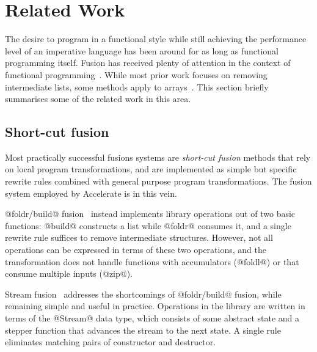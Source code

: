 \section{Related Work}
\label{sec:fusion_related_work}

The desire to program in a functional style while still achieving the
performance level of an imperative language has been around for as long as
functional programming itself. Fusion has received plenty of attention in the
context of functional
programming~\cite{Coutts:2007kp,Gill:1993de,Hu:1997tk,Meijer:1991,Rompf:2013er,Takano:1995,Wadler:1984ia,Waters:1991fp}.
While most prior work focuses on removing intermediate lists, some methods apply
to arrays~\cite{Chakravarty:2001dt,Claessen:2012hl,Grelck:2006ci,Keller:2010er}.
This section briefly summarises some of the related work in this area.


\subsection{Short-cut fusion}

Most practically successful fusions systems are \emph{short-cut fusion}
 methods that rely on local program transformations, and
are implemented as simple but specific rewrite rules combined with general
purpose program transformations. The fusion system employed by Accelerate is in
this vein.


@foldr/build@ fusion~\cite{Gill:1996tf,Gill:1993de}
instead implements library operations out of two basic functions: @build@
constructs a list while @foldr@ consumes it, and a single rewrite rule suffices
to remove intermediate structures. However, not all operations can be expressed
in terms of these two operations, and the transformation does not handle
functions with accumulators (@foldl@) or that consume multiple inputs (@zip@).

Stream fusion~\cite{Coutts:2007kp} addresses the
shortcomings of @foldr/build@ fusion, while remaining simple and useful in
practice. Operations in the library are written in terms of the @Stream@ data
type, which consists of some abstract state and a stepper function that advances
the stream to the next state. A single rule eliminates matching pairs of
constructor and destructor.

